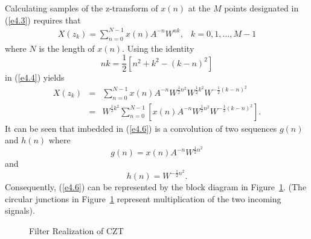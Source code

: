 	Calculating samples of the z-transform
of $x(n)$ at the $M$ points designated in (\ref{e4.3})
requires that
%
\begin{equation}
\begin{array}{cc}
{\displaystyle X(z_k)=\sum_{n=0}^{N-1}x(n)A^{-n}W^{nk}}, & k=0,1,\ldots,M-1
\end{array}
\label{e4.4}
\end{equation}
%
where $N$ is the length of $x(n)$.  Using the identity
%
\begin{equation}
nk=\frac{1}{2}[n^2+k^2-(k-n)^2]
\label{e4.5}
\end{equation}
%
in (\ref{e4.4}) yields
%
\begin{eqnarray}
X(z_k)&=&\sum_{n=0}^{N-1}x(n)A^{-n}W^{\frac{1}{2}n^2}W^{\frac{1}{2}k^2}
W^{-\frac{1}{2}(k-n)^2}\nonumber\\
      &=& W^{\frac{1}{2}k^2}\sum_{n=0}^{N-1}[x(n)A^{-n}W^{\frac{1}{2}n^2}
W^{-\frac{1}{2}(k-n)^2}].
\label{e4.6}
\end{eqnarray}
%
It can be seen that imbedded in (\ref{e4.6}) is a convolution of two
sequences $g(n)$ and $h(n)$ where
%
\begin{equation}
g(n)=x(n)A^{-n}W^{\frac{1}{2}n^2}
\label{e4.7}
\end{equation}
%
and
%
\begin{equation}
h(n)=W^{-\frac{1}{2}n^2}.
\label{e4.8}
\end{equation}
%
Consequently, (\ref{e4.6}) can be represented by the block
diagram in Figure~\ref{f4.2}.  (The circular junctions in
Figure~\ref{f4.2} represent multiplication of the two incoming
signals).
%
\begin{figure}[tb]
\caption{Filter Realization of CZT}
\label{f4.2}
\end{figure}
%

